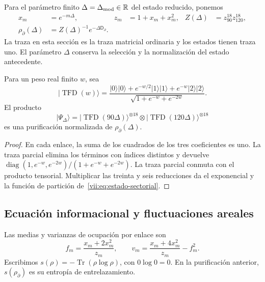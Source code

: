 Para el parámetro finito \(\Delta=\Delta_{\rm mod}\in\mathbb R\) del
estado reducido, ponemos
\begin{align}
 x_m&=e^{-m\Delta},& z_m&=1+x_m+x_m^2,&
 Z(\Delta)&=z_{90}^{18}z_{120}^{18},\\
 \rho_\partial(\Delta)&=Z(\Delta)^{-1}e^{-\Delta\mathsf D_\partial}.
 \label{vii:eq:estado-sectorial}
\end{align}
La traza en esta sección es la traza matricial ordinaria y los estados
tienen traza uno. El parámetro \(\Delta\) conserva la selección y la
normalización del estado antecedente.

\begin{proposition}
\label{vii:prop:purificacion-sectorial}
Para un peso real finito \(w\), sea
\begin{equation}
 |\operatorname{TFD}(w)\rangle
 =\frac{|0\rangle|0\rangle+e^{-w/2}|1\rangle|1\rangle
                   +e^{-w}|2\rangle|2\rangle}
        {\sqrt{1+e^{-w}+e^{-2w}}}.
 \label{vii:eq:tfd-local}
\end{equation}
El producto
\begin{equation}
 |\Psi_\Delta\rangle
 =|\operatorname{TFD}(90\Delta)\rangle^{\otimes18}
  \otimes|\operatorname{TFD}(120\Delta)\rangle^{\otimes18}
 \label{vii:eq:tfd-sectorial}
\end{equation}
es una purificación normalizada de \(\rho_\partial(\Delta)\).
\end{proposition}
\begin{proof}
En cada enlace, la suma de los cuadrados de los tres coeficientes es uno.
La traza parcial elimina los términos con índices distintos y devuelve
\(\operatorname{diag}(1,e^{-w},e^{-2w})/(1+e^{-w}+e^{-2w})\).
La traza parcial conmuta con el producto tensorial. Multiplicar las
treinta y seis reducciones da el exponencial y la función de partición
de~\eqref{vii:eq:estado-sectorial}.
\end{proof}

\subsection{Ecuación informacional y fluctuaciones areales}
\label{vii:subsec:ecuacion-informacional}

Las medias y varianzas de ocupación por enlace son
\begin{equation}
 f_m=\frac{x_m+2x_m^2}{z_m},\qquad
 v_m=\frac{x_m+4x_m^2}{z_m}-f_m^2.
 \label{vii:eq:momentos-sectoriales}
\end{equation}
Escribimos \(s(\rho)=-\operatorname{Tr}(\rho\log\rho)\), con
\(0\log0=0\). En la purificación anterior, \(s(\rho_\partial)\)
es su entropía de entrelazamiento.

